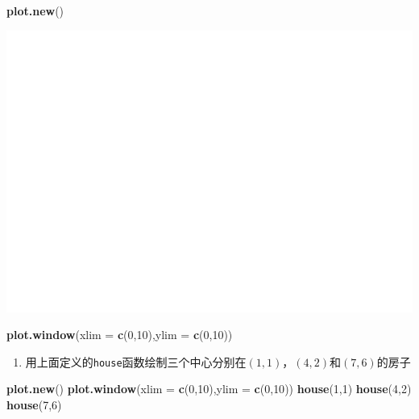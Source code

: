 \documentclass[]{article}
\newenvironment{Shaded}{\begin{snugshade}}{\end{snugshade}}
\newcommand{\DataTypeTok}[1]{\textcolor[rgb]{0.13,0.29,0.53}{#1}}
\newcommand{\DecValTok}[1]{\textcolor[rgb]{0.00,0.00,0.81}{#1}}
\newcommand{\KeywordTok}[1]{\textcolor[rgb]{0.13,0.29,0.53}{\textbf{#1}}}
\newcommand{\NormalTok}[1]{#1}
\providecommand{\tightlist}{%
  \setlength{\itemsep}{0pt}\setlength{\parskip}{0pt}}
\begin{document}
\begin{Shaded}
\begin{Highlighting}[]
\KeywordTok{plot.new}\NormalTok{()}
\end{Highlighting}
\end{Shaded}

\includegraphics{Homework_4_files/figure-latex/unnamed-chunk-2-1.pdf}

\begin{Shaded}
\begin{Highlighting}[]
\KeywordTok{plot.window}\NormalTok{(}\DataTypeTok{xlim =} \KeywordTok{c}\NormalTok{(}\DecValTok{0}\NormalTok{,}\DecValTok{10}\NormalTok{),}\DataTypeTok{ylim =} \KeywordTok{c}\NormalTok{(}\DecValTok{0}\NormalTok{,}\DecValTok{10}\NormalTok{))}
\end{Highlighting}
\end{Shaded}

\begin{enumerate}
\def\labelenumi{\alph{enumi}.}
\setcounter{enumi}{2}
\tightlist
\item
  用上面定义的\texttt{house}函数绘制三个中心分别在\((1,1)\)，\((4,2)\)和\((7, 6)\)的房子
\end{enumerate}

\begin{Shaded}
\begin{Highlighting}[]
\KeywordTok{plot.new}\NormalTok{()}
\KeywordTok{plot.window}\NormalTok{(}\DataTypeTok{xlim =} \KeywordTok{c}\NormalTok{(}\DecValTok{0}\NormalTok{,}\DecValTok{10}\NormalTok{),}\DataTypeTok{ylim =} \KeywordTok{c}\NormalTok{(}\DecValTok{0}\NormalTok{,}\DecValTok{10}\NormalTok{))}
\KeywordTok{house}\NormalTok{(}\DecValTok{1}\NormalTok{,}\DecValTok{1}\NormalTok{)}
\KeywordTok{house}\NormalTok{(}\DecValTok{4}\NormalTok{,}\DecValTok{2}\NormalTok{)}
\KeywordTok{house}\NormalTok{(}\DecValTok{7}\NormalTok{,}\DecValTok{6}\NormalTok{)}
\end{Highlighting}
\end{Shaded}
\end{document}
